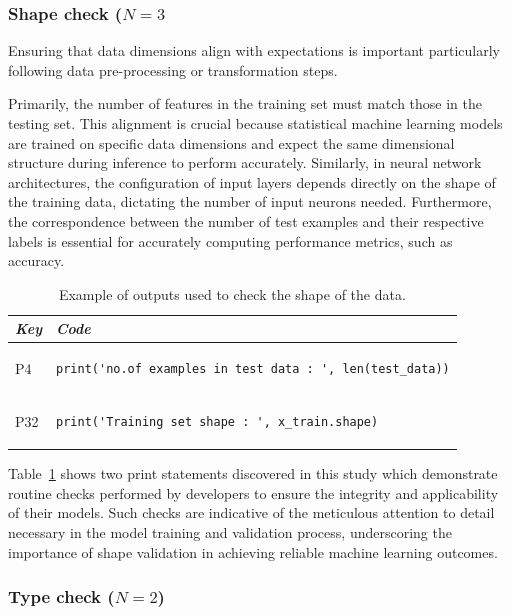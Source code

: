 \subsubsection{Shape check ($N = 3$}

Ensuring that data dimensions align with expectations is important particularly following data pre-processing or transformation steps.

Primarily, the number of features in the training set must match those in the testing set. This alignment is crucial because statistical machine learning models are trained on specific data dimensions and expect the same dimensional structure during inference to perform accurately. Similarly, in neural network architectures, the configuration of input layers depends directly on the shape of the training data, dictating the number of input neurons needed. Furthermore, the correspondence between the number of test examples and their respective labels is essential for accurately computing performance metrics, such as accuracy.

\begin{table}
\centering
\begin{tabular}{@{}m{} m{}@{}}
\toprule
\emph{\textbf{Key}} & \emph{\textbf{Code}}\\
\midrule
P4 &
\begin{lstlisting}
print('no.of examples in test data : ', len(test_data))
\end{lstlisting}\\
P32 &
\begin{lstlisting}
print('Training set shape : ', x_train.shape) 
\end{lstlisting}\\
\end{tabular}
\caption{Example of outputs used to check the shape of the data.}
\label{tab:shape-check}
\end{table}

Table~\ref{tab:shape-check} shows two print statements discovered in this study which demonstrate routine checks performed by developers to ensure the integrity and applicability of their models. Such checks are indicative of the meticulous attention to detail necessary in the model training and validation process, underscoring the importance of shape validation in achieving reliable machine learning outcomes.

\subsubsection{Type check ($N = 2$)}

